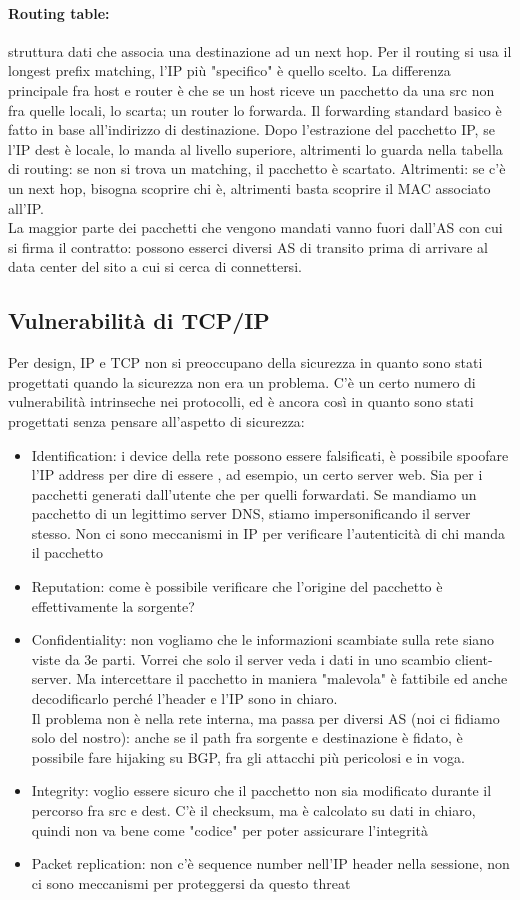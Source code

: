 \documentclass[12pt, oneside]{extbook} %
\begin{document}
\paragraph{Routing table:}struttura dati che associa una destinazione ad un next hop. Per il routing si usa il longest prefix matching, l'IP più "specifico" è quello scelto. La differenza principale fra host e router è che se un host riceve un pacchetto da una src non fra quelle locali, lo scarta; un router lo forwarda. Il forwarding standard basico è fatto in base all'indirizzo di destinazione. Dopo l'estrazione del pacchetto IP, se l'IP dest è locale, lo manda al livello superiore, altrimenti lo guarda nella tabella di routing: se non si trova un matching, il pacchetto è scartato. Altrimenti: se c'è un next hop, bisogna scoprire chi è, altrimenti basta scoprire il MAC associato all'IP.\\ La maggior parte dei pacchetti che vengono mandati vanno fuori dall'AS con cui si firma il contratto: possono esserci diversi AS di transito prima di arrivare al data center del sito a cui si cerca di connettersi.
\subsection{Vulnerabilità di TCP/IP}
Per design, IP e TCP non si preoccupano della sicurezza in quanto sono stati progettati quando la sicurezza non era un problema. C'è un certo numero di vulnerabilità intrinseche nei protocolli, ed è ancora così in quanto sono stati progettati senza pensare all'aspetto di sicurezza:
\begin{itemize}
\item Identification: i device della rete possono essere falsificati, è possibile spoofare l'IP address per dire di essere , ad esempio, un certo server web. Sia per i pacchetti generati dall'utente che per quelli forwardati. Se mandiamo un pacchetto di un legittimo server DNS, stiamo impersonificando il server stesso. Non ci sono meccanismi in IP per verificare l'autenticità di chi manda il pacchetto
\item Reputation: come è possibile verificare che l'origine del pacchetto è effettivamente la sorgente?
\item Confidentiality: non vogliamo che le informazioni scambiate sulla rete siano viste da 3e parti. Vorrei che solo il server veda i dati in uno scambio client-server. Ma intercettare il pacchetto in maniera "malevola" è fattibile ed anche decodificarlo perché l'header e l'IP sono in chiaro.\\ Il problema non è nella rete interna, ma passa per diversi AS (noi ci fidiamo solo del nostro): anche se il path fra sorgente e destinazione è fidato, è possibile fare hijaking su BGP, fra gli attacchi più pericolosi e in voga.
\item Integrity: voglio essere sicuro che il pacchetto non sia modificato durante il percorso fra src e dest. C'è il checksum, ma è calcolato su dati in chiaro, quindi non va bene come "codice" per poter assicurare l'integrità
\item Packet replication: non c'è sequence number nell'IP header nella sessione, non ci sono meccanismi per proteggersi da questo threat
\end{itemize}
\end{document}
